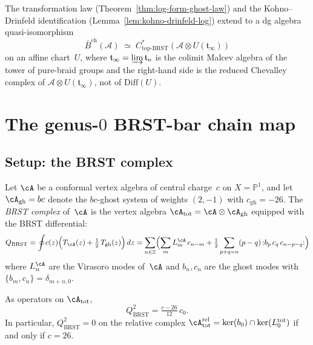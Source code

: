 \begin{conjecture}[Bar complex \texorpdfstring{$=$}{=} topological BRST;
\ClaimStatusConjectured]
\label{conj:bar-topological-brst}
The transformation law
(Theorem~\ref{thm:log-form-ghost-law}) and the Kohno--Drinfeld
identification (Lemma~\ref{lem:kohno-drinfeld-log}) extend to a
dg algebra quasi-isomorphism
\[
\bar{B}^{\mathrm{ch}}(\mathcal{A}) \;\simeq\;
C^*_{\mathrm{top}\text{-}\mathrm{BRST}}(\mathcal{A}
\otimes U(\mathfrak{t}_\infty))
\]
on an affine chart~$U$, where $\mathfrak{t}_\infty = \varinjlim \mathfrak{t}_n$
is the colimit Malcev algebra of the tower of pure-braid groups and
the right-hand side is the reduced Chevalley complex of
$\mathcal{A} \otimes U(\mathfrak{t}_\infty)$, not of
$\mathrm{Diff}(U)$.
\end{conjecture}

\section{The genus-\texorpdfstring{$0$}{0} BRST-bar chain map}
\label{sec:brst-bar-chain-map}

\subsection{Setup: the BRST complex}

Let $\cA$ be a conformal vertex algebra of central charge~$c$ on
$X = \mathbb{P}^1$, and let $\cA_{\mathrm{gh}} = bc$ denote the
$bc$-ghost system of weights $(2, -1)$ with $c_{\mathrm{gh}} = -26$.
The \emph{BRST complex} of~$\cA$ is the vertex algebra
$\cA_{\mathrm{tot}} = \cA \otimes \cA_{\mathrm{gh}}$ equipped with
the BRST differential:
\begin{equation}\label{eq:brst-differential}
Q_{\mathrm{BRST}}
= \oint \! c(z)\Bigl(T_{\cA}(z) + \tfrac{1}{2}\,T_{\mathrm{gh}}(z)\Bigr)\,dz
= \sum_{n \in \mathbb{Z}} \Bigl(
 \sum_m L^{\cA}_m\, c_{n-m}
 + \tfrac{1}{2}\sum_{p+q=n}(p-q)\, {:}b_p\, c_q\, c_{n-p-q}{:}
\Bigr)
\end{equation}
where $L^{\cA}_n$ are the Virasoro modes of~$\cA$ and $b_n, c_n$ are
the ghost modes with $\{b_m, c_n\} = \delta_{m+n,0}$.

\begin{lemma}
\label{lem:brst-nilpotence}
As operators on $\cA_{\mathrm{tot}}$,
\[
Q_{\mathrm{BRST}}^2 = \tfrac{c - 26}{12}\,c_0.
\]
In particular, $Q_{\mathrm{BRST}}^2 = 0$ on the relative complex
$\cA_{\mathrm{tot}}^{\mathrm{rel}} = \ker(b_0) \cap \ker(L_0^{\mathrm{tot}})$
if and only if $c = 26$.
\end{lemma}

